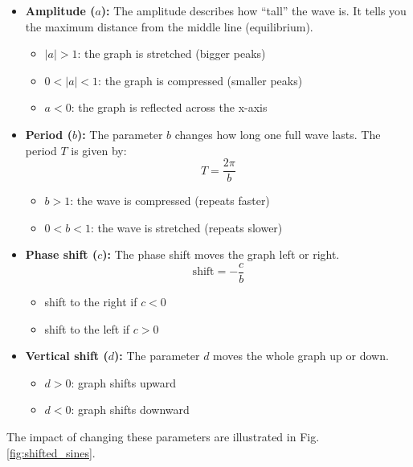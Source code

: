 \begin{itemize}
    \item \textbf{Amplitude ($a$):}  
    The amplitude describes how ``tall'' the wave is. It tells you the maximum distance from the middle line (equilibrium).
    \begin{itemize}
        \item $|a| > 1$: the graph is stretched (bigger peaks)
        \item $0 < |a| < 1$: the graph is compressed (smaller peaks)
        \item $a < 0$: the graph is reflected across the x-axis
    \end{itemize}

    \item \textbf{Period ($b$):}  
    The parameter $b$ changes how long one full wave lasts.
    The period $T$ is given by:
    \begin{equation}
        T = \frac{2\pi}{b}
    \end{equation}
    \begin{itemize}
        \item $b > 1$: the wave is compressed (repeats faster)
        \item $0 < b < 1$: the wave is stretched (repeats slower)
    \end{itemize}

    \item \textbf{Phase shift ($c$):}  
    The phase shift moves the graph left or right.
    \begin{equation}
        \text{shift} = -\frac{c}{b}
    \end{equation}
    \begin{itemize}
        \item shift to the right if $c < 0$
        \item shift to the left if $c > 0$
    \end{itemize}

    \item \textbf{Vertical shift ($d$):}  
    The parameter $d$ moves the whole graph up or down.
    \begin{itemize}
        \item $d > 0$: graph shifts upward
        \item $d < 0$: graph shifts downward
    \end{itemize}
\end{itemize}

The impact of changing these parameters are illustrated in Fig. \ref{fig:shifted_sines}.

